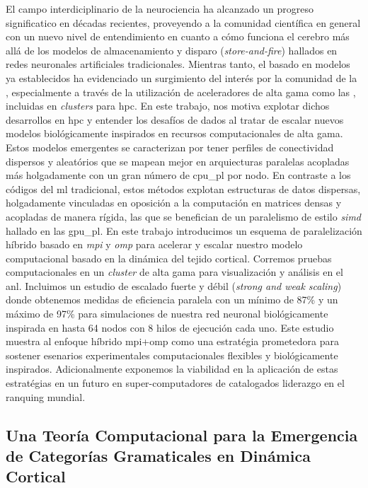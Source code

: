 El campo interdiciplinario de la neurociencia ha alcanzado un progreso significatico en décadas recientes, proveyendo a la comunidad científica en general con un nuevo nivel de entendimiento en cuanto a cómo funciona el cerebro más allá de los modelos de almacenamiento y disparo (\emph{store-and-fire}) hallados en redes neuronales artificiales tradicionales.
Mientras tanto, el  basado en modelos ya establecidos ha evidenciado un surgimiento del interés por la comunidad de la , especialmente a través de la utilización de aceleradores de alta gama como las , incluidas en \emph{clusters} para \gls{hpc}. 
En este trabajo, nos motiva explotar dichos desarrollos en \gls{hpc} y entender los desafíos de dados al tratar de escalar nuevos modelos biológicamente inspirados en recursos computacionales de alta gama.
Estos modelos emergentes se caracterizan por tener perfiles de conectividad dispersos y aleatórios que se mapean mejor en arquiecturas paralelas acopladas más holgadamente con un gran número de \gls{cpu_pl} por nodo.
En contraste a los códigos del \gls{ml} tradicional, estos métodos explotan estructuras de datos dispersas, holgadamente vinculadas en oposición a la computación en matrices densas y acopladas de manera rígida, las que se benefician de un paralelismo de estilo \emph{\gls{simd}} hallado en las \gls{gpu_pl}.
En este trabajo introducimos un esquema de paralelización híbrido basado en \emph{\gls{mpi}} y \emph{\gls{omp}} para acelerar y escalar nuestro modelo computacional basado en la dinámica del tejido cortical.
Corremos pruebas computacionales en un \emph{cluster} de alta gama para visualización y análisis en el \gls{anl}.
Incluimos un estudio de escalado fuerte y débil (\emph{strong and weak scaling}) donde obtenemos medidas de eficiencia paralela con un mínimo de 87\% y un máximo de 97\% para simulaciones de nuestra red neuronal biológicamente inspirada en hasta 64 nodos con 8 hilos de ejecución cada uno.
Este estudio muestra al enfoque híbrido \gls{mpi}+\gls{omp} como una estratégia prometedora para sostener esenarios experimentales computacionales flexibles y biológicamente inspirados.
Adicionalmente exponemos la viabilidad en la aplicación de estas estratégias en un futuro en super-computadores de catalogados liderazgo en el ranquing mundial.





\subsection{Una Teoría Computacional para la Emergencia de Categorías Gramaticales en Dinámica Cortical}


